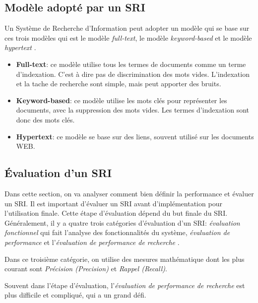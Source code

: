 \subsection{Modèle adopté par un SRI}
Un Système de Recherche d'Information peut adopter un modèle qui se base sur ces trois modèles qui est le modèle \textit{full-text}, le modèle \textit{keyword-based} et le modèle \textit{hypertext} \citep{modern-ir}.
\begin{itemize}
	\item \textbf{Full-text}: ce modèle utilise tous les termes de documents comme un terme d'indexation. C'est à dire pas de discrimination des mots vides. L'indexation et la tache de recherche sont simple, mais peut apporter des bruits.
	\item \textbf{Keyword-based}: ce modèle utilise les mots clés pour représenter les documents, avec la suppression des mots vides. Les termes d'indexation sont donc des mots clés.
	\item \textbf{Hypertext}: ce modèle se base sur des liens, souvent utilisé sur les documents WEB.
\end{itemize}

\subsection{Évaluation d'un SRI}
Dans cette section, on va analyser comment bien définir la performance et évaluer un SRI. Il est important d’évaluer un SRI avant d’implémentation pour l'utilisation finale. Cette étape d'évaluation dépend du but finale du SRI. Généralement, il y a quatre trois catégories d'évaluation d'un SRI: \textit{évaluation fonctionnel} qui fait l'analyse des fonctionnalités du système, \textit{évaluation de performance} et l'\textit{évaluation de performance de recherche} \citep{modern-ir}.

Dans ce troisième catégorie, on utilise des mesures mathématique dont les plus courant sont \textit{Précision (Precision)} et \textit{Rappel (Recall)}.

Souvent dans l'étape d'évaluation, l'\textit{évaluation de performance de recherche} est plus difficile et compliqué, qui a un grand défi.

